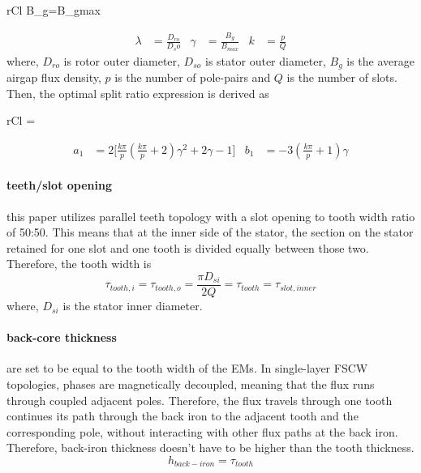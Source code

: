 \documentclass [a4 paper, 11pt, titlepage] {article}
\begin{document}
	\begin{IEEEeqnarray*}{rCl}
		B_g=B_{gmax}
	\end{IEEEeqnarray*}
	\begin{align}
		\lambda&=\frac{D_{ro}}{D_so} & \gamma&=\frac{B_g}{B_{max}} & k&=\frac{p}{Q}
		\label{eq:Wulambdagammak}
	\end{align}
	where, $D_{ro}$ is rotor outer diameter, $D_{so}$ is stator outer diameter, $B_g$ is the average airgap flux density, $p$ is the number of pole-pairs and $Q$ is the number of slots. Then, the optimal split ratio expression is derived as
	\begin{IEEEeqnarray*}{rCl}
		\lambda=
	\end{IEEEeqnarray*}
	\begin{align*}
		a_1&=2\big[\frac{k\pi}{p}(\frac{k\pi}{p}+2)\gamma^2+2\gamma-1\big] & b_1&=-3(\frac{k\pi}{p}+1)\gamma
	\end{align*}
		
	\paragraph{teeth/slot opening} this paper utilizes parallel teeth topology with a slot opening to tooth width ratio of 50:50. This means that at the inner side of the stator, the section on the stator retained for one slot and one tooth is divided equally between those two. Therefore, the tooth width is
	\begin{equation}
		\tau_{tooth,i}=\tau_{tooth,o}=\frac{\pi D_{si}}{2Q}=\tau_{tooth}=\tau_{slot,inner}
	\end{equation}
	where, $D_{si}$ is the stator inner diameter.
	
	\paragraph{back-core thickness} are set to be equal to the tooth width of the EMs. In single-layer FSCW topologies, phases are magnetically decoupled, meaning that the flux runs through coupled adjacent poles. Therefore, the flux travels through one tooth continues its path through the back iron to the adjacent tooth and the corresponding pole, without interacting with other flux paths at the back iron. Therefore, back-iron thickness doesn't have to be higher than the tooth thickness. 
	\begin{equation}
		h_{back-iron}=\tau_{tooth}
	\end{equation}
\end{document}
